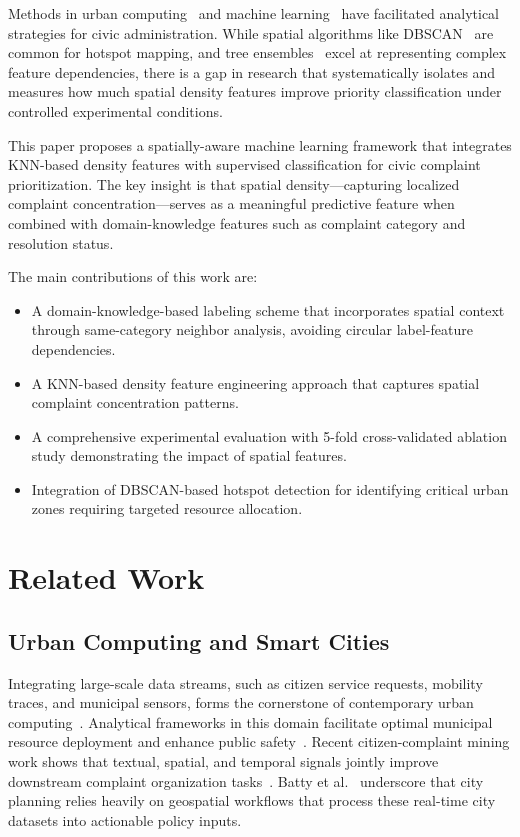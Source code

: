 \documentclass[conference]{IEEEtran}
\begin{document}
Methods in urban computing~\cite{zheng2014urban} and machine learning~\cite{bishop2006pattern} have facilitated analytical strategies for civic administration. While spatial algorithms like DBSCAN~\cite{ester1996dbscan} are common for hotspot mapping, and tree ensembles~\cite{breiman1984classification,breiman2001random} excel at representing complex feature dependencies, there is a gap in research that systematically isolates and measures how much spatial density features improve priority classification under controlled experimental conditions.

This paper proposes a spatially-aware machine learning framework that integrates KNN-based density features with supervised classification for civic complaint prioritization. The key insight is that spatial density---capturing localized complaint concentration---serves as a meaningful predictive feature when combined with domain-knowledge features such as complaint category and resolution status.

The main contributions of this work are:
\begin{itemize}
    \item A domain-knowledge-based labeling scheme that incorporates spatial context through same-category neighbor analysis, avoiding circular label-feature dependencies.
    \item A KNN-based density feature engineering approach that captures spatial complaint concentration patterns.
    \item A comprehensive experimental evaluation with 5-fold cross-validated ablation study demonstrating the impact of spatial features.
    \item Integration of DBSCAN-based hotspot detection for identifying critical urban zones requiring targeted resource allocation.
\end{itemize}

\section{Related Work}

\subsection{Urban Computing and Smart Cities}

Integrating large-scale data streams, such as citizen service requests, mobility traces, and municipal sensors, forms the cornerstone of contemporary urban computing~\cite{zheng2014urban}. Analytical frameworks in this domain facilitate optimal municipal resource deployment and enhance public safety~\cite{gharaibeh2017smart,silva2018towards}. Recent citizen-complaint mining work shows that textual, spatial, and temporal signals jointly improve downstream complaint organization tasks~\cite{gao2019star}. Batty et al.~\cite{batty2013big} underscore that city planning relies heavily on geospatial workflows that process these real-time city datasets into actionable policy inputs.
\end{document}

